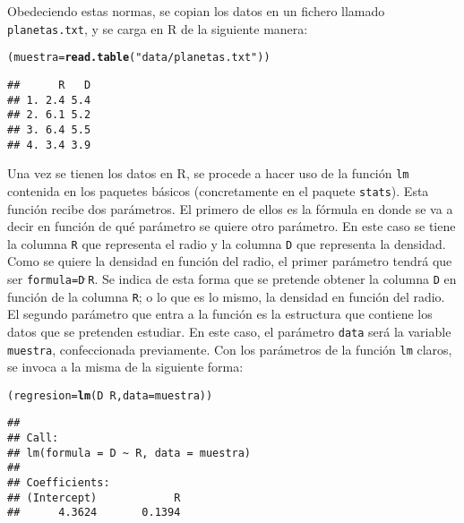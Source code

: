 \documentclass[12pt]{report}\usepackage[]{graphicx}\usepackage[dvipsnames]{xcolor}
\makeatletter
\newcommand{\hlstr}[1]{\textcolor[rgb]{0.192,0.494,0.8}{#1}}%
\newcommand{\hlopt}[1]{\textcolor[rgb]{0,0,0}{#1}}%
\newcommand{\hlstd}[1]{\textcolor[rgb]{0.345,0.345,0.345}{#1}}%
\newcommand{\hlkwb}[1]{\textcolor[rgb]{0.69,0.353,0.396}{#1}}%
\newcommand{\hlkwc}[1]{\textcolor[rgb]{0.333,0.667,0.333}{#1}}%
\newcommand{\hlkwd}[1]{\textcolor[rgb]{0.737,0.353,0.396}{\textbf{#1}}}%
\newenvironment{kframe}{%
 \def\at@end@of@kframe{}%
 \ifinner\ifhmode%
  \def\at@end@of@kframe{\end{minipage}}%
  \begin{minipage}{\columnwidth}%
 \fi\fi%
 \def\FrameCommand##1{\hskip\@totalleftmargin \hskip-\fboxsep
 \colorbox{shadecolor}{##1}\hskip-\fboxsep
     \hskip-\linewidth \hskip-\@totalleftmargin \hskip\columnwidth}%
 \MakeFramed {\advance\hsize-\width
   \@totalleftmargin\z@ \linewidth\hsize
   \@setminipage}}%
 {\par\unskip\endMakeFramed%
 \at@end@of@kframe}
\newenvironment{knitrout}{}{} %
\makeatother
\begin{document}
			Obedeciendo estas normas, se copian los datos en un fichero llamado \texttt{planetas.txt}, y se carga en R de la siguiente manera:
			
\begin{knitrout}
\color{fgcolor}\begin{kframe}
\begin{alltt}
\hlstd{(muestra} \hlkwb{=} \hlkwd{read.table}\hlstd{(}\hlstr{"data/planetas.txt"}\hlstd{))}
\end{alltt}
\begin{verbatim}
##      R   D
## 1. 2.4 5.4
## 2. 6.1 5.2
## 3. 6.4 5.5
## 4. 3.4 3.9
\end{verbatim}
\end{kframe}
\end{knitrout}
			
			Una vez se tienen los datos en R, se procede a hacer uso de la función \texttt{lm} contenida en los paquetes básicos (concretamente en el paquete \texttt{stats}). Esta función recibe dos parámetros. El primero de ellos es la fórmula en donde se va a decir en función de qué parámetro se quiere otro parámetro. En este caso se tiene la columna \texttt{R} que representa el radio y la columna \texttt{D} que representa la densidad. Como se quiere la densidad en función del radio, el primer parámetro tendrá que ser \texttt{formula=D$\tilde{\phantom{.}}$R}. Se indica de esta forma que se pretende obtener la columna \texttt{D} en función de la columna \texttt{R}; o lo que es lo mismo, la densidad en función del radio.\\ 
			
			El segundo parámetro que entra a la función es la estructura que contiene los datos que se pretenden estudiar. En este caso, el parámetro \texttt{data} será la variable \texttt{muestra}, confeccionada previamente. Con los parámetros de la función \texttt{lm} claros, se invoca a la misma de la siguiente forma:
			
\begin{knitrout}
\color{fgcolor}\begin{kframe}
\begin{alltt}
\hlstd{(regresion}\hlkwb{=}\hlkwd{lm}\hlstd{(D}\hlopt{~}\hlstd{R,} \hlkwc{data}\hlstd{=muestra))}
\end{alltt}
\begin{verbatim}
## 
## Call:
## lm(formula = D ~ R, data = muestra)
## 
## Coefficients:
## (Intercept)            R  
##      4.3624       0.1394
\end{verbatim}
\end{kframe}
\end{knitrout}
			
\end{document}
